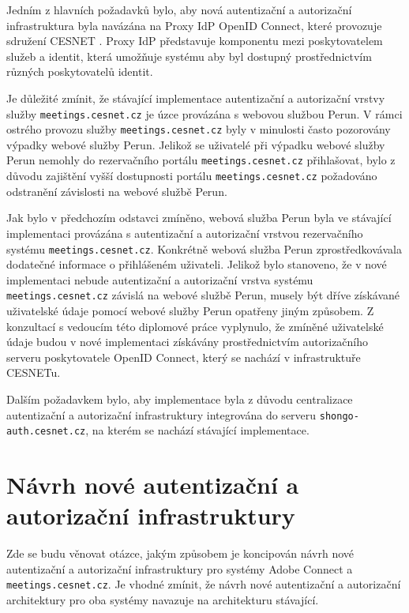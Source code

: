 \documentclass[
  printed, %
  twoside, %
  table,   %
  nolof,     %
  nolot,     %
]{fithesis3}
\begin{document}
\par
Jedním z hlavních požadavků bylo, aby nová autentizační a autorizační infrastruktura byla navázána na Proxy IdP OpenID Connect, které provozuje sdružení CESNET \cite{proxyIdpPresentation}. Proxy IdP představuje komponentu mezi poskytovatelem služeb a identit, která umožňuje systému aby byl dostupný prostřednictvím různých poskytovatelů identit. 
\par

\par 
Je důležité zmínit, že stávající implementace autentizační a autorizační vrstvy služby \texttt{meetings.cesnet.cz} je úzce provázána s webovou službou Perun. V rámci ostrého provozu služby \texttt{meetings.cesnet.cz} byly v minulosti často pozorovány výpadky webové služby Perun. Jelikož se uživatelé při výpadku webové služby Perun nemohly do rezervačního portálu \texttt{meetings.cesnet.cz} přihlašovat, bylo z důvodu zajištění vyšší dostupnosti portálu \texttt{meetings.cesnet.cz} požadováno odstranění závislosti na webové službě Perun. 

\par 

Jak bylo v předchozím odstavci zmíněno, webová služba Perun byla ve stávající implementaci provázána s autentizační a autorizační vrstvou rezervačního systému \texttt{meetings.cesnet.cz}. Konkrétně webová služba Perun zprostředkovávala dodatečné informace o přihlášeném uživateli. Jelikož bylo stanoveno, že v nové implementaci nebude autentizační a autorizační vrstva systému \texttt{meetings.cesnet.cz} závislá na webové službě Perun, musely být dříve získávané uživatelské údaje pomocí webové služby Perun opatřeny jiným způsobem. Z konzultací s vedoucím této diplomové práce vyplynulo, že zmíněné uživatelské údaje budou v nové implementaci získávány prostřednictvím autorizačního serveru poskytovatele OpenID Connect, který se nachází v infrastruktuře CESNETu.     

\par

Dalším požadavkem bylo, aby implementace byla z důvodu centralizace autentizační a autorizační infrastruktury integrována do serveru \texttt{shongo-auth.cesnet.cz}, na kterém se nachází stávající implementace. 

\section{Návrh nové autentizační a autorizační infrastruktury}
Zde se budu věnovat otázce, jakým způsobem je koncipován návrh nové autentizační a autorizační infrastruktury pro systémy Adobe Connect a \texttt{meetings.cesnet.cz}. Je vhodné zmínit, že návrh nové autentizační a autorizační architektury pro oba systémy navazuje na architekturu stávající. 
\end{document}

